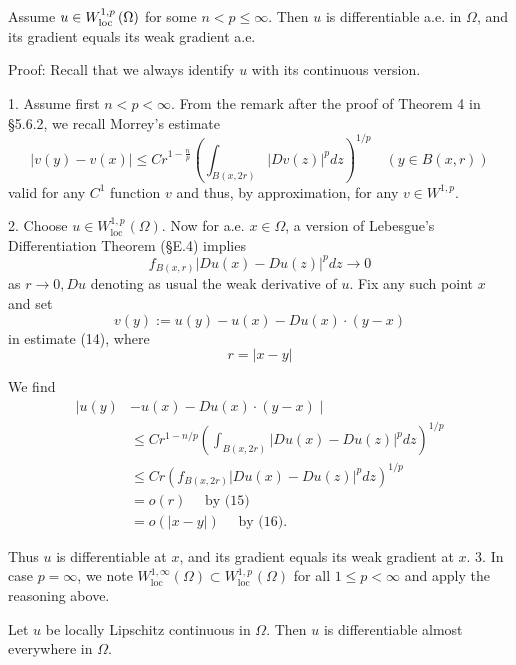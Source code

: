 \begin{theorem}
    Assume $u \in W_{\operatorname{\operatorname{loc}}}^{1, p}\left(\Omega\right)$ for some $n<p \leq \infty$. Then $u$ is differentiable a.e. in $\Omega$, and its gradient equals its weak gradient a.e.

    Proof:
    Recall that we always identify $u$ with its continuous version.

    1. Assume first $n<p<\infty$. From the remark after the proof of Theorem 4 in §5.6.2, we recall Morrey's estimate
    \begin{equation*}
        |v(y)-v(x)| \leq C r^{1-\frac{n}{p}}\left(\int_{B(x, 2 r)}|D v(z)|^p d z\right)^{1 / p} \quad(y \in B(x, r))
    \end{equation*}
    valid for any $C^1$ function $v$ and thus, by approximation, for any $v \in W^{1, p}$.

    2. Choose $u \in W_{\text {loc }}^{1, p}\left(\Omega\right)$. Now for a.e. $x \in \Omega$, a version of Lebesgue's Differentiation Theorem (§E.4) implies
    \begin{equation*}
        f_{B(x, r)}|D u(x)-D u(z)|^p d z \rightarrow 0
    \end{equation*}
    as $r \rightarrow 0, D u$ denoting as usual the weak derivative of $u$. Fix any such point $x$ and set
    \begin{equation*}
        v(y):=u(y)-u(x)-D u(x) \cdot(y-x)
    \end{equation*}
    in estimate (14), where
    \begin{equation*}
        r=|x-y|
    \end{equation*}

    We find
    \begin{equation*}
        \begin{aligned}
            \mid u(y) & -u(x)-D u(x) \cdot(y-x) \mid                                                 \\
                      & \leq C r^{1-n / p}\left(\int_{B(x, 2 r)}|D u(x)-D u(z)|^p d z\right)^{1 / p} \\
                      & \leq C r\left(f_{B(x, 2 r)}|D u(x)-D u(z)|^p d z\right)^{1 / p}              \\
                      & =o(r) \quad \text { by (15) }                                                \\
                      & =o(|x-y|) \quad \text { by (16). }
        \end{aligned}
    \end{equation*}

    Thus $u$ is differentiable at $x$, and its gradient equals its weak gradient at $x$.
    3. In case $p=\infty$, we note $W_{\text {loc }}^{1, \infty}\left(\Omega\right) \subset W_{\text {loc }}^{1, p}\left(\Omega\right)$ for all $1 \leq p<\infty$ and apply the reasoning above.
\end{theorem}

\begin{theorem}
    Let $u$ be locally Lipschitz continuous in $\Omega$. Then $u$ is differentiable almost everywhere in $\Omega$.
\end{theorem}












